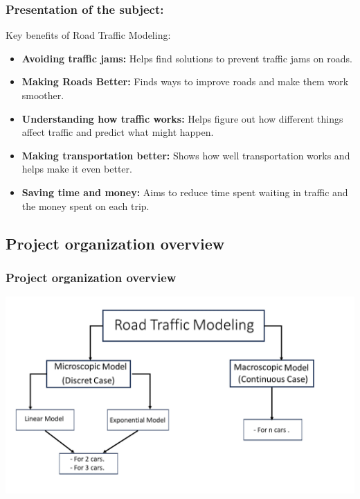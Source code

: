 \documentclass{beamer}
\begin{document}
\begin{frame}
        \frametitle{Presentation of the subject:}
	\begin{block}{Key benefits of Road Traffic Modeling:}
		\begin{itemize}
	\item \textbf{Avoiding traffic jams:} Helps find solutions to prevent traffic jams on roads.
	\item \textbf{Making Roads Better:} Finds ways to improve roads and make them work smoother.
	\item \textbf{Understanding how traffic works:} Helps figure out how different things affect traffic and predict what might happen.
	\item \textbf{Making transportation better:} Shows how well transportation works and helps make it even better.
	\item \textbf{Saving time and money:} Aims to reduce time spent waiting in traffic and the money spent on each trip.
\end{itemize}
	\end{block}
\end{frame}

\begin{frame}
\subsection{Project organization overview}
\frametitle{Project organization overview}
\begin{center}
    \includegraphics[width=1\textwidth]{org1.png} 
    \end{center}
\end{frame}
\end{document}
